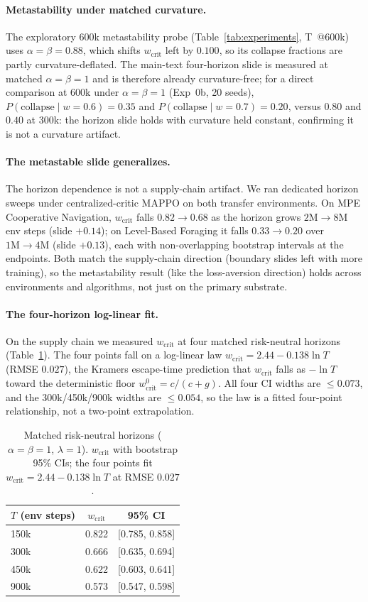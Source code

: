 \documentclass[letterpaper]{article} %
\theoremstyle{plain}
\newcommand{\wcrit}{w_{\mathrm{crit}}}
\begin{document}
\paragraph{Metastability under matched curvature.}
The exploratory 600k metastability probe (Table~\ref{tab:experiments}, T~@600k) uses
$\alpha{=}\beta{=}0.88$, which shifts $\wcrit$ left by $0.100$, so its collapse fractions are partly
curvature-deflated. The main-text four-horizon slide is measured at matched $\alpha{=}\beta{=}1$ and
is therefore already curvature-free; for a direct comparison at 600k under $\alpha{=}\beta{=}1$
(Exp~0b, 20 seeds), $P(\mathrm{collapse}\mid w{=}0.6)=0.35$ and $P(\mathrm{collapse}\mid w{=}0.7)=0.20$,
versus $0.80$ and $0.40$ at 300k: the horizon slide holds with curvature held constant, confirming
it is not a curvature artifact.

\paragraph{The metastable slide generalizes.}
The horizon dependence is not a supply-chain artifact. We ran dedicated horizon sweeps under
centralized-critic MAPPO on both transfer environments. On MPE Cooperative Navigation,
$\wcrit$ falls $0.82\to0.68$ as the horizon grows $2\mathrm{M}\to8\mathrm{M}$ env steps (slide
$+0.14$); on Level-Based Foraging it falls $0.33\to0.20$ over $1\mathrm{M}\to4\mathrm{M}$
(slide $+0.13$), each with non-overlapping bootstrap intervals at the endpoints. Both match
the supply-chain direction (boundary slides left with more training), so the metastability
result (like the loss-aversion direction) holds across environments and algorithms, not just
on the primary substrate.

\paragraph{The four-horizon log-linear fit.}
On the supply chain we measured $\wcrit$ at four matched risk-neutral horizons
(Table~\ref{tab:horizons}). The four points fall on a log-linear law $\wcrit=2.44-0.138\ln T$
(RMSE $0.027$), the Kramers escape-time prediction that $\wcrit$ falls as $-\ln T$ toward the
deterministic floor $\wcrit^0=c/(c+g)$. All four CI widths are ${\le}0.073$, and the
300k/450k/900k widths are ${\le}0.054$, so the law is a fitted four-point relationship, not a
two-point extrapolation.

\begin{table}[t]
\centering \small
\caption{Matched risk-neutral horizons ($\alpha{=}\beta{=}1$, $\lambda{=}1$). $\wcrit$ with
bootstrap 95\% CIs; the four points fit $\wcrit=2.44-0.138\ln T$ at RMSE $0.027$.}
\label{tab:horizons}
\begin{tabular}{lcc}
\toprule
$T$ (env steps) & $\wcrit$ & 95\% CI \\
\midrule
150k & 0.822 & [0.785, 0.858] \\
300k & 0.666 & [0.635, 0.694] \\
450k & 0.622 & [0.603, 0.641] \\
900k & 0.573 & [0.547, 0.598] \\
\bottomrule
\end{tabular}
\end{table}
\end{document}
